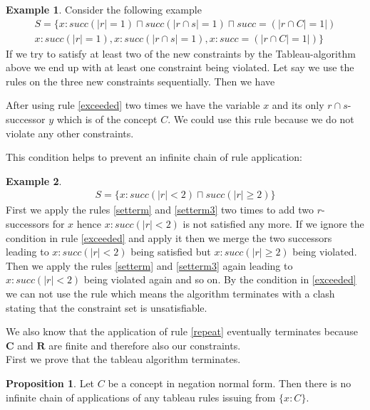 \documentclass[a4paper,11pt]{scrartcl}
\theoremstyle{break}
\theoremstyle{definition}
\newtheorem{mypro}{Proposition}
\newtheorem{ex}{Example}
\begin{document}
\begin{ex}
Consider the following example 
\begin{align*}
S=\{x:succ(|r|=1)\sqcap succ(|r\cap s|=1)\sqcap succ=(|r\cap C|=1|)\\
x:succ(|r|=1), x:succ(|r\cap s|=1), x:succ=(|r\cap C|=1|)
\}
\end{align*}
If we try to satisfy at least two of the new constraints by the Tableau-algorithm above we end up with at least one constraint being violated. Let say we use the rules on the three new constraints sequentially. Then we have 
\begin{figure}[H]
\centering
{}
\end{figure}
After using rule \ref{exceeded} two times we have the variable $x$ and its only $r\cap s$-successor $y$ which is of the concept $C$. We could use this rule because we do not violate any other constraints. 
\end{ex}
This condition helps to prevent an infinite chain of rule application:
\begin{ex}
\begin{align*}
S=\{x:succ(|r|<2)\sqcap succ(|r|\geq 2)\}	
\end{align*}
First we apply the rules \ref{setterm} and \ref{setterm3} two times to add two $r$-successors for $x$ hence $x:succ(|r|<2)$ is not satisfied any more. If we ignore the condition in rule \ref{exceeded} and apply it then we merge the two successors leading to $x:succ(|r|<2)$ being satisfied but $x:succ(|r|\geq 2)$ being violated. Then we apply the rules \ref{setterm} and \ref{setterm3} again leading to $x:succ(|r|<2)$ being violated again and so on. By the condition in \ref{exceeded} we can not use the rule which means the algorithm terminates with a clash stating that the constraint set is unsatisfiable.
\end{ex}
We also know that the application of rule \ref{repeat} eventually terminates because $\mathbf{C}$ and $\mathbf{R}$ are finite and therefore also our constraints.\\
First we prove that the tableau algorithm terminates. 
\begin{mypro}
Let $C$ be a concept in negation normal form. Then there is no infinite chain of applications of any tableau rules issuing from $\{x:C\}$. 
\end{mypro}
\end{document}
